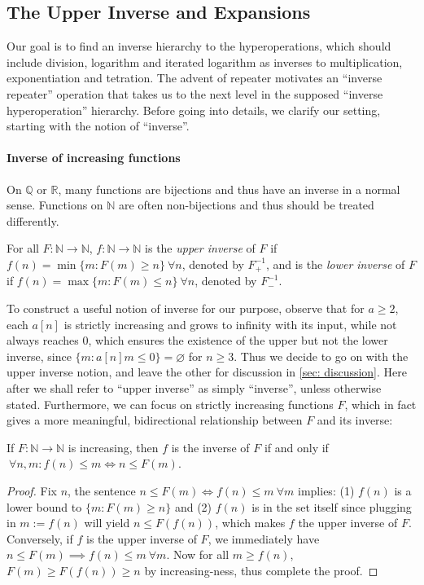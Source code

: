 \subsection{The Upper Inverse and Expansions}

Our goal is to find an inverse hierarchy to the hyperoperations, which should include division, logarithm and iterated logarithm as inverses to multiplication, exponentiation and tetration. The advent of repeater motivates an ``inverse repeater'' operation that takes us to the next level in the supposed ``inverse hyperoperation'' hierarchy. Before going into details, we clarify our setting, starting with the notion of ``inverse''.

\paragraph{Inverse of increasing functions} On $\mathbb{Q}$ or $\mathbb{R}$, many functions are bijections and thus have an inverse in a normal sense. Functions on $\mathbb{N}$ are often non-bijections and thus should be treated differently.
\begin{defn} \label{defn: inverse}
	For all $F:\mathbb{N}\to \mathbb{N}$, $f:\mathbb{N}\to \mathbb{N}$ is the \emph{upper inverse} of $F$ if $f(n) = \min\{m : F(m)\ge n\} \ \forall n$, denoted by $F^{-1}_+$, and is the \emph{lower inverse} of $F$ if $f(n) = \max\{m : F(m)\le n\} \ \forall n$, denoted by $F^{-1}_-$.
\end{defn}
To construct a useful notion of inverse for our purpose, observe that for $a\ge 2$, each $a[n]$ is strictly increasing and grows to infinity with its input, while not always reaches $0$, which ensures the existence of the upper but not the lower inverse, since $\{m : a[n]m \le 0 \} = \varnothing$ for $n\ge 3$. Thus we decide to go on with the upper inverse notion, and leave the other for discussion in \cref{sec: discussion}. Here after we shall refer to ``upper inverse'' as simply ``inverse'', unless otherwise stated. Furthermore, we can focus on strictly increasing functions $F$, which in fact gives a more meaningful, bidirectional relationship between $F$ and its inverse:
\begin{thm} \label{thm: upp-inverse-rel}
	If $F:\mathbb{N}\to \mathbb{N}$ is increasing, then $f$ is the inverse of $F$ if and only if $\ \forall n, m : f(n)\le m \iff n \le F(m)$.
\end{thm}
\begin{proof}
Fix $n$, the sentence $n\le F(m) \iff f(n)\le m \ \forall m$ implies: (1) $f(n)$ is a lower bound to $\{m: F(m)\ge n \}$ and (2) $f(n)$ is in the set itself since plugging in $m := f(n)$ will yield $n\le F(f(n))$, which makes $f$ the upper inverse of $F$. Conversely, if $f$ is the upper inverse of $F$, we immediately have $n\le F(m)\implies f(n)\le m \ \forall m$. Now for all $m \ge f(n)$, $F(m)\ge F(f(n)) \ge n$ by increasing-ness, thus complete the proof.
\end{proof}


